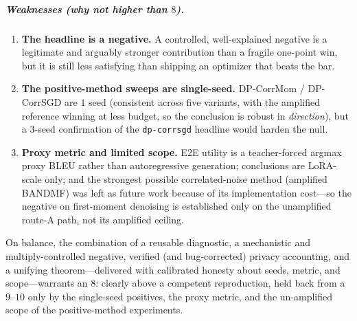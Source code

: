 \documentclass[11pt]{article}
\theoremstyle{plain}
\theoremstyle{definition}
\theoremstyle{remark}
\begin{document}
\subparagraph*{Weaknesses (why not higher than $8$).}
\begin{enumerate}[leftmargin=1.6em,itemsep=2pt,topsep=2pt]
\item \textbf{The headline is a negative.} A controlled, well-explained negative is a legitimate
and arguably stronger contribution than a fragile one-point win, but it is still less satisfying
than shipping an optimizer that beats the bar.
\item \textbf{The positive-method sweeps are single-seed.} DP-CorrMom / DP-CorrSGD are $1$ seed
(consistent across five variants, with the amplified reference winning at less budget, so the
conclusion is robust in \emph{direction}), but a $3$-seed confirmation of the \texttt{dp-corrsgd}
headline would harden the null.
\item \textbf{Proxy metric and limited scope.} E2E utility is a teacher-forced argmax proxy BLEU
rather than autoregressive generation; conclusions are LoRA-scale only; and the strongest possible
correlated-noise method (amplified BANDMF) was left as future work because of its implementation
cost---so the negative on first-moment denoising is established only on the unamplified route-A
path, not its amplified ceiling.
\end{enumerate}

\noindent
On balance, the combination of a reusable diagnostic, a mechanistic and multiply-controlled
negative, verified (and bug-corrected) privacy accounting, and a unifying theorem---delivered with
calibrated honesty about seeds, metric, and scope---warrants an $8$: clearly above a competent
reproduction, held back from a $9$--$10$ only by the single-seed positives, the proxy metric, and
the un-amplified scope of the positive-method experiments.
\end{document}
